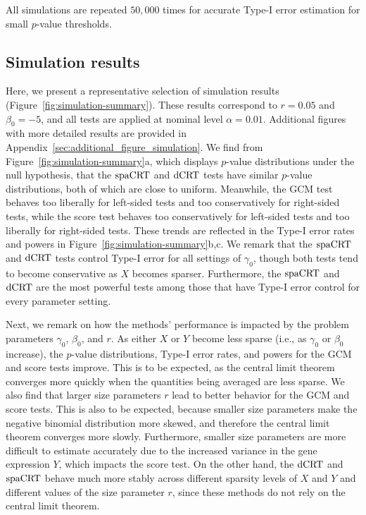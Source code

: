\documentclass[12pt]{article}
\theoremstyle{definition}
\newcommand{\srx}{X}									%
\newcommand{\sry}{Y}									%
\newcommand{\dCRT}{\textnormal{dCRT}} 					%
\newcommand{\spacrt}{\textnormal{spaCRT}}               %
\begin{document}
All simulations are repeated $50,000$ times for accurate Type-I error estimation for small $p$-value thresholds. 

\subsection{Simulation results}

Here, we present a representative selection of simulation results (Figure~\ref{fig:simulation-summary}). These results correspond to $r = 0.05$ and $\beta_0 = -5$, and all tests are applied at nominal level $\alpha = 0.01$. Additional figures with more detailed results are provided in Appendix~\ref{sec:additional_figure_simulation}. We find from Figure~\ref{fig:simulation-summary}a, which displays $p$-value distributions under the null hypothesis, that the $\spacrt$ and $\dCRT$ tests have similar $p$-value distributions, both of which are close to uniform. Meanwhile, the GCM test behaves too liberally for left-sided tests and too conservatively for right-sided tests, while the score test behaves too conservatively for left-sided tests and too liberally for right-sided tests. These trends are reflected in the Type-I error rates and powers in Figure~\ref{fig:simulation-summary}b,c. We remark that the $\spacrt$ and $\dCRT$ tests control Type-I error for all settings of $\gamma_0$, though both tests tend to become conservative as $\srx$ becomes sparser. Furthermore, the $\spacrt$ and $\dCRT$ are the most powerful tests among those that have Type-I error control for every parameter setting.

Next, we remark on how the methods' performance is impacted by the problem parameters $\gamma_0$, $\beta_0$, and $r$. As either $\srx$ or $\sry$ become less sparse (i.e., as $\gamma_0$ or $\beta_0$ increase), the $p$-value distributions, Type-I error rates, and powers for the GCM and score tests improve. This is to be expected, as the central limit theorem converges more quickly when the quantities being averaged are less sparse. We also find that larger size parameters $r$ lead to better behavior for the GCM and score tests. This is also to be expected, because smaller size parameters make the negative binomial distribution more skewed, and therefore the central limit theorem converges more slowly. Furthermore, smaller size parameters are more difficult to estimate accurately due to the increased variance in the gene expression $\sry$, which impacts the score test. On the other hand, the $\dCRT$ and $\spacrt$ behave much more stably across different sparsity levels of $\srx$ and $\sry$ and different values of the size parameter $r$, since these methods do not rely on the central limit theorem. 
\end{document}
